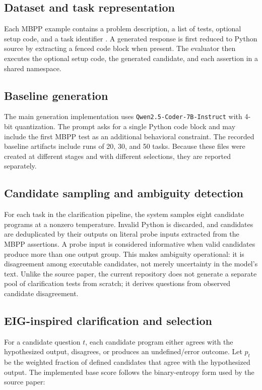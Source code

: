 \subsection{Dataset and task representation}

Each MBPP example contains a problem description, a list of tests, optional setup code, and a task identifier \cite{austin2021program}. A generated response is first reduced to Python source by extracting a fenced code block when present. The evaluator then executes the optional setup code, the generated candidate, and each assertion in a shared namespace.

\subsection{Baseline generation}

The main generation implementation uses \texttt{Qwen2.5-Coder-7B-Instruct} with 4-bit quantization. The prompt asks for a single Python code block and may include the first MBPP test as an additional behavioral constraint. The recorded baseline artifacts include runs of 20, 30, and 50 tasks. Because these files were created at different stages and with different selections, they are reported separately.

\subsection{Candidate sampling and ambiguity detection}

For each task in the clarification pipeline, the system samples eight candidate programs at a nonzero temperature. Invalid Python is discarded, and candidates are deduplicated by their outputs on literal probe inputs extracted from the MBPP assertions. A probe input is considered informative when valid candidates produce more than one output group. This makes ambiguity operational: it is disagreement among executable candidates, not merely uncertainty in the model's text. Unlike the source paper, the current repository does not generate a separate pool of clarification tests from scratch; it derives questions from observed candidate disagreement.

\subsection{EIG-inspired clarification and selection}

For a candidate question $t$, each candidate program either agrees with the hypothesized output, disagrees, or produces an undefined/error outcome. Let $p_t$ be the weighted fraction of defined candidates that agree with the hypothesized output. The implemented base score follows the binary-entropy form used by the source paper:

